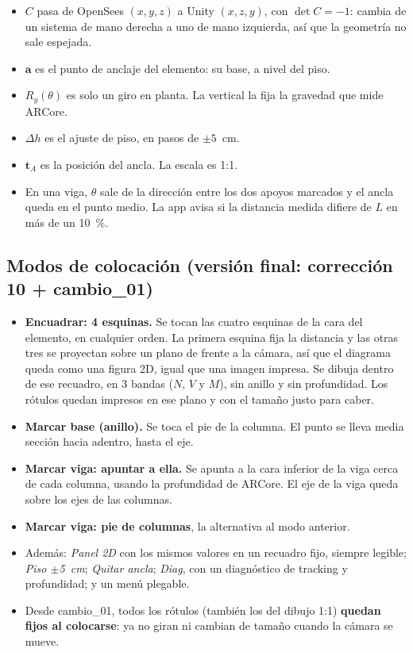 \documentclass[11pt,a4paper]{article}
\begin{document}
\begin{itemize}
  \item $C$ pasa de OpenSees $(x,y,z)$ a Unity $(x,z,y)$, con
        $\det C = -1$: cambia de un sistema de mano derecha a uno de mano
        izquierda, así que la geometría no sale espejada.
  \item $\mathbf{a}$ es el punto de anclaje del elemento: su base, a nivel del
        piso.
  \item $R_y(\theta)$ es solo un giro en planta. La vertical la fija la gravedad
        que mide ARCore.
  \item $\Delta h$ es el ajuste de piso, en pasos de $\pm5$~cm.
  \item $\mathbf{t}_A$ es la posición del ancla. La escala es 1:1.
  \item En una viga, $\theta$ sale de la dirección entre los dos apoyos
        marcados y el ancla queda en el punto medio. La app avisa si la
        distancia medida difiere de $L$ en más de un 10~\%.
\end{itemize}

\subsection{Modos de colocación (versión final: corrección 10 + cambio\_01)}

\begin{itemize}
  \item \textbf{Encuadrar: 4 esquinas.} Se tocan las cuatro esquinas de la cara
        del elemento, en cualquier orden. La primera esquina fija la distancia y
        las otras tres se proyectan sobre un plano de frente a la cámara, así
        que el diagrama queda como una figura 2D, igual que una imagen impresa.
        Se dibuja dentro de ese recuadro, en 3 bandas ($N$, $V$ y $M$), sin
        anillo y sin profundidad. Los rótulos quedan impresos en ese plano y
        con el tamaño justo para caber.
  \item \textbf{Marcar base (anillo).} Se toca el pie de la columna. El punto se
        lleva media sección hacia adentro, hasta el eje.
  \item \textbf{Marcar viga: apuntar a ella.} Se apunta a la cara inferior de la
        viga cerca de cada columna, usando la profundidad de ARCore. El eje de
        la viga queda sobre los ejes de las columnas.
  \item \textbf{Marcar viga: pie de columnas}, la alternativa al modo anterior.
  \item Además: \emph{Panel 2D} con los mismos valores en un recuadro fijo,
        siempre legible; \emph{Piso $\pm$5~cm}; \emph{Quitar ancla};
        \emph{Diag}, con un diagnóstico de tracking y profundidad; y un menú
        plegable.
  \item Desde cambio\_01, todos los rótulos (también los del dibujo 1:1)
        \textbf{quedan fijos al colocarse}: ya no giran ni cambian de tamaño
        cuando la cámara se mueve.
\end{itemize}
\end{document}
